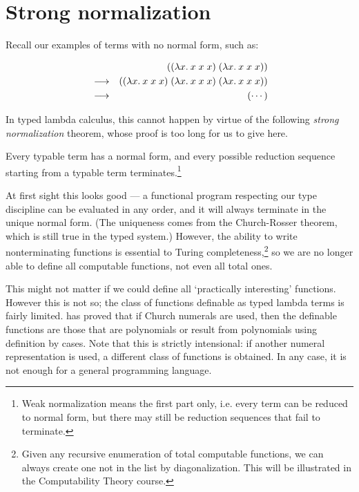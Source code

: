 \section{Strong normalization}

Recall our examples of terms with no normal form, such as:

\begin{eqnarray*}
& & ((\lambda x.\: x\; x\; x)\;(\lambda x.\: x\; x\; x))     \\
& \longrightarrow & ((\lambda x.\: x\; x\; x)\;(\lambda x.\: x\; x\; x)\;
                            (\lambda x.\: x\; x\; x))                           \\
& \longrightarrow & (\cdots)
\end{eqnarray*}

In typed lambda calculus, this cannot happen by virtue of the following
{\em strong normalization} theorem, whose proof is too long for us to give
here.

\begin{theorem}
Every typable term has a normal form, and every possible reduction sequence
starting from a typable term terminates.\footnote{Weak normalization means the
first part only, i.e. every term can be reduced to normal form, but there may
still be reduction sequences that fail to terminate.} \end{theorem}

At first sight this looks good --- a functional program respecting our type
discipline can be evaluated in any order, and it will always terminate in the
unique normal form. (The uniqueness comes from the Church-Rosser theorem, which
is still true in the typed system.) However, the ability to write
nonterminating functions is essential to Turing completeness,\footnote{Given
any recursive enumeration of total computable functions, we can always create
one not in the list by diagonalization. This will be illustrated in the
Computability Theory course.} so we are no longer able to define all computable
functions, not even all total ones.

This might not matter if we could define all `practically interesting'
functions. However this is not so; the class of functions definable as typed
lambda terms is fairly limited.  has
proved that if Church numerals are used, then the definable functions are those
that are polynomials or result from polynomials using definition by cases. Note
that this is strictly intensional: if another numeral representation is used, a
different class of functions is obtained. In any case, it is not enough for a
general programming language.

